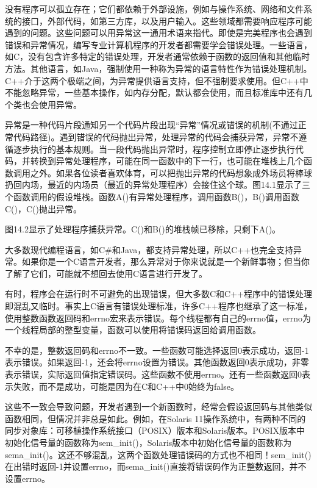
没有程序可以孤立存在；它们都依赖于外部设施，例如与操作系统、网络和文件系统的接口，外部代码，如第三方库，以及用户输入。这些领域都需要响应程序可能遇到的问题。这些问题可以用异常这一通用术语来指代。即使是完美程序也会遇到错误和异常情况，编写专业计算机程序的开发者都需要学会错误处理。一些语言，如C，没有包含许多特定的错误处理，开发者通常依赖于函数的返回值和其他临时方法。其他语言，如Java，强制使用一种称为异常的语言特性作为错误处理机制。C++介于这两个极端之间，为异常提供语言支持，但不强制要求使用。但C++中不能忽略异常，一些基本操作，如内存分配，默认都会使用，而且标准库中还有几个类也会使用异常。


异常是一种代码片段通知另一个代码片段出现“异常”情况或错误的机制(不通过正常代码路径)。遇到错误的代码抛出异常，处理异常的代码会捕获异常，异常不遵循逐步执行的基本规则。当一段代码抛出异常时，程序控制立即停止逐步执行代码，并转换到异常处理程序，可能在同一函数中的下一行，也可能在堆栈上几个函数调用之外。如果各位读者喜欢体育，可以把抛出异常的代码想象成外场员将棒球扔回内场，最近的内场员（最近的异常处理程序）会接住这个球。图14.1显示了三个函数调用的假设堆栈。函数A()有异常处理程序，调用函数B()，B()调用函数C()，C()抛出异常。


图14.2显示了处理程序捕获异常。C()和B()的堆栈帧已移除，只剩下A()。


大多数现代编程语言，如C\#和Java，都支持异常处理，所以C++也完全支持异常。如果你是一个C语言开发者，那么异常对于你来说就是一个新鲜事物；但当你了解了它们，可能就不想回去使用C语言进行开发了。


有时，程序会在运行时不可避免的出现错误，但大多数C和C++程序中的错误处理即混乱又临时。事实上C语言有错误处理标准，许多C++程序也继承了这一标准，使用整数函数返回码和errno宏来表示错误。每个线程都有自己的errno值，errno为一个线程局部的整型变量，函数可以使用将错误码返回给调用函数。

不幸的是，整数返回码和errno不一致。一些函数可能选择返回0表示成功，返回-1表示错误。如果返回-1，还会将errno设置为错误。其他函数返回0表示成功，非零表示错误，实际返回值指定错误码。这些函数不使用errno。还有一些函数返回0表示失败，而不是成功，可能是因为在C和C++中0始终为false。

这些不一致会导致问题，开发者遇到一个新函数时，经常会假设返回码与其他类似函数相同，但情况并非总是如此。例如，在Solaris 11操作系统中，有两种不同的同步对象库：可移植操作系统接口（POSIX）版本和Solaris版本。POSIX版本中初始化信号量的函数称为sem\_init()，Solaris版本中初始化信号量的函数称为sema\_init()。这还不够混乱，这两个函数处理错误码的方式也不相同！sem\_init()在出错时返回-1并设置errno，而sema\_init()直接将错误码作为正整数返回，并不设置errno。

